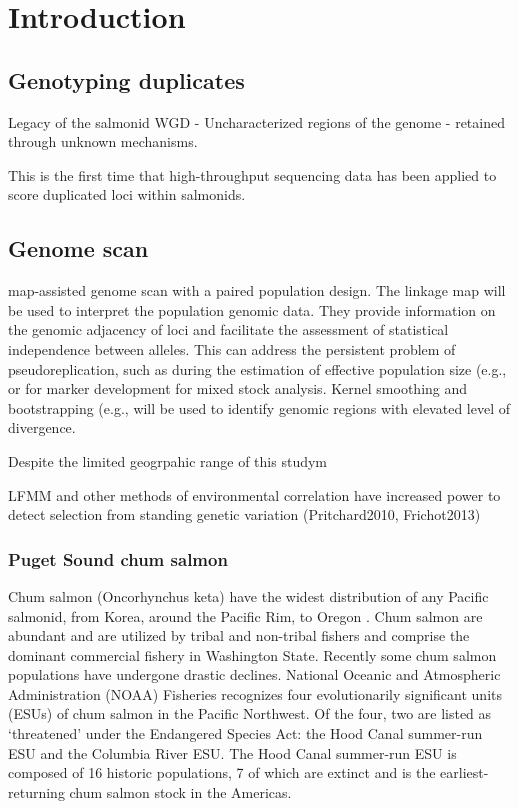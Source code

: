 \documentclass[12pt, one column]{article}
\begin{document}
\section*{Introduction}

\subsection*{Genotyping duplicates}
Legacy of the salmonid WGD - Uncharacterized regions of the genome - retained through unknown mechanisms.  

This is the first time that high-throughput sequencing data has been applied to score duplicated loci within salmonids.

\subsection*{Genome scan}
map-assisted genome scan with a paired population design. The linkage map will be used to interpret the population genomic data. They provide information on the genomic adjacency of loci and facilitate the  assessment of statistical independence between alleles.  This can address the persistent problem of pseudoreplication, such as during the estimation of effective population size (e.g., \citet{Larson2014} or for marker development for mixed stock analysis. Kernel smoothing and bootstrapping (e.g., \citet{Hohenlohe2010} will be used to identify genomic regions with elevated level of divergence.

Despite the limited geogrpahic range of this studym 

LFMM and other methods of environmental correlation have increased power to detect selection from standing genetic variation (Pritchard2010, Frichot2013)

\subsubsection*{Puget Sound chum salmon}

Chum salmon (Oncorhynchus keta) have the widest distribution of any Pacific salmonid, from Korea, around the Pacific Rim, to Oregon \citep{Salo1991}. Chum salmon are abundant and are utilized by tribal and non-tribal fishers and comprise the dominant commercial fishery in Washington State. Recently some chum salmon populations have undergone drastic declines.  National Oceanic and Atmospheric Administration (NOAA) Fisheries recognizes four evolutionarily significant units (ESUs) of chum salmon in the Pacific Northwest. Of the four, two are listed as ‘threatened’ under the Endangered Species Act: the Hood Canal summer-run ESU and the Columbia River ESU. The Hood Canal summer-run ESU is composed of 16 historic populations, 7 of which are extinct \citep{Good2005} and is the earliest-returning chum salmon stock in the Americas. 
\end{document}
